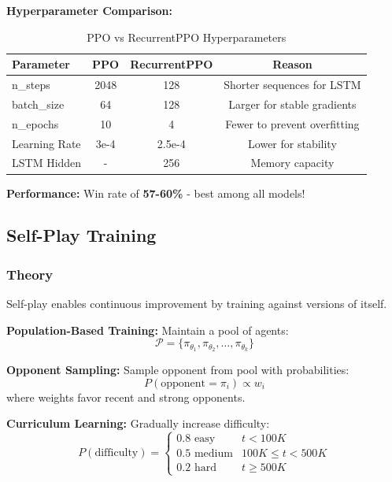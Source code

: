 \documentclass[12pt,a4paper]{article}
\begin{document}
\textbf{Hyperparameter Comparison:}
\begin{table}[H]
\centering
\begin{tabular}{lccc}
\toprule
\textbf{Parameter} & \textbf{PPO} & \textbf{RecurrentPPO} & \textbf{Reason} \\
\midrule
n\_steps & 2048 & 128 & Shorter sequences for LSTM \\
batch\_size & 64 & 128 & Larger for stable gradients \\
n\_epochs & 10 & 4 & Fewer to prevent overfitting \\
Learning Rate & 3e-4 & 2.5e-4 & Lower for stability \\
LSTM Hidden & - & 256 & Memory capacity \\
\bottomrule
\end{tabular}
\caption{PPO vs RecurrentPPO Hyperparameters}
\label{tab:ppo_vs_rppo}
\end{table}
\textbf{Performance:} Win rate of \textbf{57-60\%} - best among all models!
\newpage
\subsection{Self-Play Training}
\label{subsec:selfplay}
\subsubsection{Theory}
Self-play enables continuous improvement by training against versions of itself.

\textbf{Population-Based Training:}
Maintain a pool of agents:
\begin{equation}
    \mathcal{P} = \{\pi_{\theta_1}, \pi_{\theta_2}, \ldots, \pi_{\theta_k}\}
\end{equation}

\textbf{Opponent Sampling:}
Sample opponent from pool with probabilities:
\begin{equation}
    P(\text{opponent} = \pi_i) \propto w_i
\end{equation}
where weights favor recent and strong opponents.

\textbf{Curriculum Learning:}
Gradually increase difficulty:
\begin{equation}
    P(\text{difficulty}) = \begin{cases}
        0.8 \text{ easy} & t < 100K \\
        0.5 \text{ medium} & 100K \leq t < 500K \\
        0.2 \text{ hard} & t \geq 500K
    \end{cases}
\end{equation}
\end{document}
